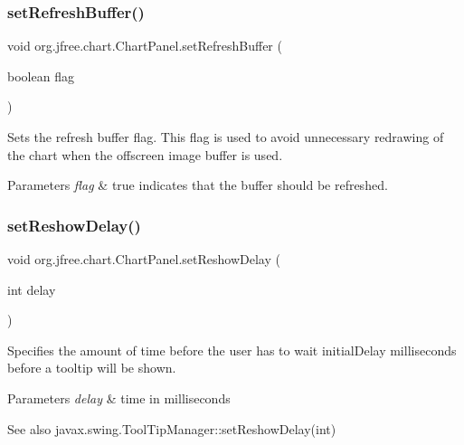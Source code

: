 \subsubsection{\texorpdfstring{set\+Refresh\+Buffer()}{setRefreshBuffer()}}
{\footnotesize\ttfamily void org.\+jfree.\+chart.\+Chart\+Panel.\+set\+Refresh\+Buffer (\begin{DoxyParamCaption}\item[{boolean}]{flag }\end{DoxyParamCaption})}

Sets the refresh buffer flag. This flag is used to avoid unnecessary redrawing of the chart when the offscreen image buffer is used.


\begin{DoxyParams}{Parameters}
{\em flag} & {\ttfamily true} indicates that the buffer should be refreshed. \\
\hline
\end{DoxyParams}
\mbox{\label{classorg_1_1jfree_1_1chart_1_1_chart_panel_ad2a0f0af88a7e32e2491cd754bc74328}} 
\subsubsection{\texorpdfstring{set\+Reshow\+Delay()}{setReshowDelay()}}
{\footnotesize\ttfamily void org.\+jfree.\+chart.\+Chart\+Panel.\+set\+Reshow\+Delay (\begin{DoxyParamCaption}\item[{int}]{delay }\end{DoxyParamCaption})}

Specifies the amount of time before the user has to wait initial\+Delay milliseconds before a tooltip will be shown.


\begin{DoxyParams}{Parameters}
{\em delay} & time in milliseconds\\
\hline
\end{DoxyParams}
\begin{DoxySeeAlso}{See also}
javax.\+swing.\+Tool\+Tip\+Manager\+::set\+Reshow\+Delay(int) 
\end{DoxySeeAlso}
\mbox{\label{classorg_1_1jfree_1_1chart_1_1_chart_panel_a1425e60bacadbe242d75b7880da29994}} 
